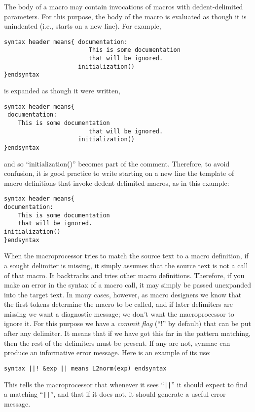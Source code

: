 \documentclass[12pt]{article}
\begin{document}
The body of a macro may contain invocations of macros with dedent-delimited parameters.
For this purpose, the body of the macro is evaluated as though it is unindented (i.e., starts on a new line). 
For example,
\begin{lstlisting}[frame=single]
syntax header means{ documentation:
                        This is some documentation 
                        that will be ignored.
                     initialization()
}endsyntax
\end{lstlisting}
is expanded as though it were written,
\begin{lstlisting}[frame=single]
syntax header means{ 
 documentation:
    This is some documentation 
                        that will be ignored.
                     initialization()
}endsyntax
\end{lstlisting}
and so ``initialization()'' becomes part of the comment.
Therefore, to avoid confusion, it is good practice to write starting on a new line the template of macro definitions that invoke dedent delimited macros, as in this example:
\begin{lstlisting}[frame=single]
syntax header means{ 
documentation:
    This is some documentation 
    that will be ignored.
initialization()
}endsyntax
\end{lstlisting}
When the macroprocessor tries to match the source text to a macro definition, if a sought delimiter is missing, it simply assumes that the source text is not a call of that macro.
It backtracks and tries other macro definitions.
Therefore, if you make an error in the syntax of a macro call, it may simply be passed unexpanded into the target text.
In many cases, however, as macro designers we know that the first tokens determine the macro to be called, and if later delimiters are missing we want a diagnostic message; we don't want the macroprocessor to ignore it.
For this purpose we have a \emph{commit flag} (``!'' by default) that can be put after any delimiter.
It means that if we have got this far in the pattern matching, then the rest of the delimiters must be present.
If any are not, synmac can produce an informative error message.
Here is an example of its use:
\begin{lstlisting}[frame=single]
syntax ||! &exp || means L2norm(exp) endsyntax 
\end{lstlisting}
This tells the macroprocessor that whenever it sees ``\lstinline"||"'' it should expect to find a matching ``\lstinline"||"'', and that if it does not, it should generate a useful error message.
\end{document}
